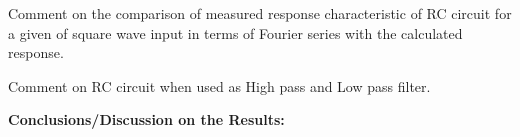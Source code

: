 \documentclass[9pt]{scrreprt}
\begin{document}
\noindent Comment on the comparison of measured response characteristic of RC circuit for a given of square wave input in terms of Fourier series with the calculated response.

\noindent Comment on RC circuit when used as High pass and Low pass filter.

\noindent \textbf{Conclusions/Discussion on the Results:}
\end{document}
